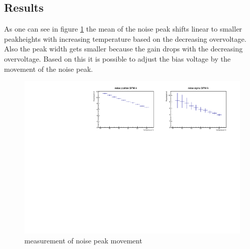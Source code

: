\subsection{Results}
As one can see in figure \ref{NoiseMove} the mean of the noise peak shifts linear to smaller peakheights with increasing temperature based on the decreasing overvoltage. Also the peak width gets smaller because the gain drops with the decreasing overvoltage. Based on this it is possible to adjust the bias voltage by the movement of the noise peak.
\begin{figure}[h]
	\centering
	\includegraphics[width = .99\textwidth]{Figures/radermacher/result_ExpGauOnlySipmATriggerNEW.pdf}
	\caption{measurement of noise peak movement}
	\label{NoiseMove}
\end{figure}
